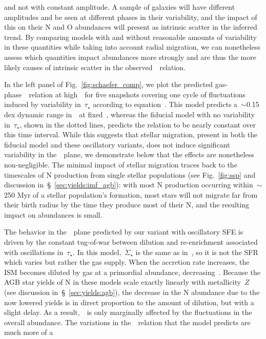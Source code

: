 \documentclass[ms.tex]{subfiles}
\begin{document}
and not with constant amplitude.
A sample of galaxies will have different amplitudes and be seen at different
phases in their variability, and the impact of this on their N and O abundances
will present as intrinsic scatter in the inferred trend.
By comparing models with and without reasonable amounts of variability in these
quantities while taking into account radial migration, we can nonetheless
assess which quantities impact abundances more strongly and are thus the more
likely causes of intrinsic scatter in the observed~\ohno~relation.
\par
In the left panel of Fig.~\ref{fig:schaefer_comp}, we plot the predicted
gas-phase~\ohno~relation at high~\oh~for five snapshots covering one cycle of
fluctuations induced by variability in~$\tau_\star$ according to
equation~.
This model predicts a~$\sim$0.15 dex dynamic range in~\no~at fixed~\oh, whereas
the fiducial model with no variability in~$\tau_\star$, shown in the dotted
lines, predicts the relation to be nearly constant over this time interval.
While this suggests that stellar migration, present in both the fiducial model
and these oscillatory variants, does not induce significant variability in
the~\ohno~plane, we demonstrate below that the effects are nonetheless
non-negligible.
The minimal impact of stellar migration traces back to the timescales of N
production from single stellar populations (see Fig.~\ref{fig:ssp} and
discussion in~\S~\ref{sec:yields:imf_agb}): with most N production occurring
within~$\sim$250 Myr of a stellar population's formation, most stars will not
migrate far from their birth radius by the time they produce most of their N,
and the resulting impact on abundances is small.
\par
The behavior in the~\ohno~plane predicted by our variant with oscillatory SFE
is driven by the constant tug-of-war between dilution and re-enrichment
associated with oscillations in~$\tau_\star$.
In this model,~$\dot{\Sigma}_\star$ is the same as in~\citet{Johnson2021}, so
it is not the SFR which varies but rather the gas supply.
When the accretion rate increases, the ISM becomes diluted by gas at a
primordial abundance, decreasing~\oh.
Because the AGB star yields of N in these models scale exactly linearly with
metallicity~$Z$ (see discussion in~\S~\ref{sec:yields:agb}), the decrease in
the N abundance due to the now lowered yields is in direct proportion to the
amount of dilution, but with a slight delay.
As a result,~\no~is only marginally affected by the fluctuations in the overall
abundance.
The variations in the~\ohno~relation that the model predicts are much more of a
\end{document}

